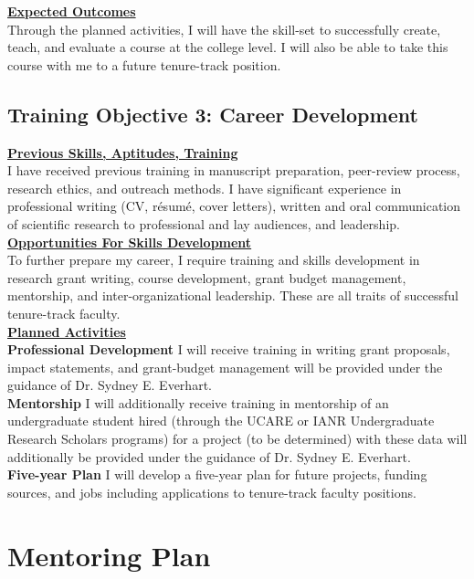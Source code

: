 \documentclass[12pt,letterpaper]{article}
\begin{document}
\noindent \textbf{\underline{Expected Outcomes}}\\
Through the planned activities, I will have the skill-set to successfully create, teach, and evaluate a course at the college level. I will also be able to take this course with me to a future tenure-track position. 

\subsection{Training Objective 3: Career Development}

\noindent \textbf{\underline{Previous Skills, Aptitudes, Training}}\\
I have received previous training in manuscript preparation, peer-review process, research ethics, and outreach methods. I have significant experience in professional writing (CV, r\'esum\'e, cover letters), written and oral communication of scientific research to professional and lay audiences, and leadership.\\

\noindent \textbf{\underline{Opportunities For Skills Development}}\\
To further prepare my career, I require training and skills development in research grant writing, course development, grant budget management,
mentorship, and inter-organizational leadership. These are all traits of successful tenure-track faculty.\\

\noindent \textbf{\underline{Planned Activities}}\\
\noindent \textbf{Professional Development} I will receive training in writing grant proposals, impact statements, and grant-budget management will be provided under the guidance of Dr. Sydney E. Everhart.\\
\noindent \textbf{Mentorship} I will additionally receive training in mentorship of an undergraduate student hired (through the UCARE or IANR Undergraduate Research Scholars programs) for a project (to be determined) with these data will additionally be provided under the guidance of Dr. Sydney E. Everhart. \\
\noindent \textbf{Five-year Plan} I will develop a five-year plan for future projects, funding sources, and jobs including applications to tenure-track faculty positions.




\section{Mentoring Plan}
\end{document}
